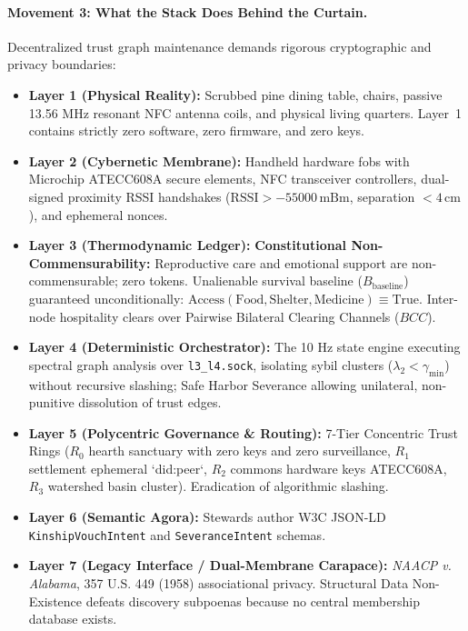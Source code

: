 \paragraph{Movement 3: What the Stack Does Behind the Curtain.}
Decentralized trust graph maintenance demands rigorous cryptographic and privacy boundaries:
\begin{itemize}
    \item \textbf{Layer 1 (Physical Reality):} Scrubbed pine dining table, chairs, passive 13.56 MHz resonant NFC antenna coils, and physical living quarters. Layer~1 contains strictly zero software, zero firmware, and zero keys.
    \item \textbf{Layer 2 (Cybernetic Membrane):} Handheld hardware fobs with Microchip ATECC608A secure elements, NFC transceiver controllers, dual-signed proximity RSSI handshakes ($\mathrm{RSSI} > -55000\,\mathrm{mBm}$, separation $< 4\,\mathrm{cm}$), and ephemeral nonces.
    \item \textbf{Layer 3 (Thermodynamic Ledger):} \textbf{Constitutional Non-Commensurability:} Reproductive care and emotional support are non-commensurable; zero tokens. Unalienable survival baseline ($B_{\mathrm{baseline}}$) guaranteed unconditionally: $\mathrm{Access}(\mathrm{Food}, \mathrm{Shelter}, \mathrm{Medicine}) \equiv \mathrm{True}$. Inter-node hospitality clears over Pairwise Bilateral Clearing Channels ($BCC$).
    \item \textbf{Layer 4 (Deterministic Orchestrator):} The 10 Hz state engine executing spectral graph analysis over \texttt{l3\_l4.sock}, isolating sybil clusters ($\lambda_2 < \gamma_{\mathrm{min}}$) without recursive slashing; Safe Harbor Severance allowing unilateral, non-punitive dissolution of trust edges.
    \item \textbf{Layer 5 (Polycentric Governance \& Routing):} 7-Tier Concentric Trust Rings ($R_0$ hearth sanctuary with zero keys and zero surveillance, $R_1$ settlement ephemeral `did:peer`, $R_2$ commons hardware keys ATECC608A, $R_3$ watershed basin cluster). Eradication of algorithmic slashing.
    \item \textbf{Layer 6 (Semantic Agora):} Stewards author W3C JSON-LD \texttt{KinshipVouchIntent} and \texttt{SeveranceIntent} schemas.
    \item \textbf{Layer 7 (Legacy Interface / Dual-Membrane Carapace):} \textit{NAACP v. Alabama}, 357 U.S. 449 (1958) associational privacy. Structural Data Non-Existence defeats discovery subpoenas because no central membership database exists.
\end{itemize}

